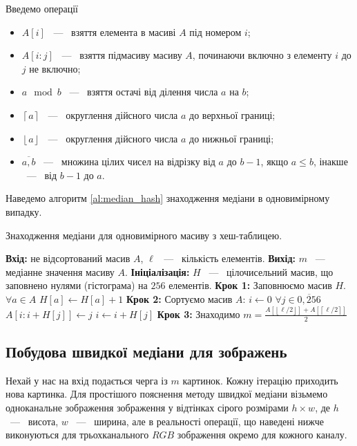 Введемо операції
\begin{itemize}
    \item $A[i]$ ~---~ взяття елемента в масиві $A$ під номером $i$;
    \item $A[i:j]$ ~---~ взяття підмасиву масиву $A$, починаючи включно з елементу $i$ до $j$ не включно;
    \item $a \mod b$ ~---~ взяття остачі від ділення числа $a$ на $b$;
    \item $\left\lceil a \right\rceil$ ~---~ округлення дійсного числа $a$ до верхньої границі;
    \item $\left\lfloor a \right\rfloor$ ~---~ округлення дійсного числа $a$ до нижньої границі;
    \item $\overline{a,b}$ ~---~ множина цілих чисел на відрізку від $a$ до $b-1$, якщо $a \le b$,
          інакше  ~---~ від $b-1$ до $a$.
\end{itemize}
Наведемо алгоритм \ref{al:median_hash} знаходження медіани в одновимірному випадку.

\begin{algorithm}[H]
    \caption{Знаходження медіани для одновимірного масиву з хеш-таблицею.}
    \label{al:median_hash}
    \begin{algorithmic}
        \State \textbf{Вхід:} не відсортований масив $A$, $\ell$ ~---~ кількість елементів.
        \State \textbf{Вихід:} $m$ ~---~ медіанне значення масиву $A$.
        \State \textbf{Ініціалізація:} $H$ ~---~ цілочисельний масив, що заповнено нулями (гістограма) на $256$ елементів.
        \State \textbf{Крок 1:} Заповнюємо масив $H$.
        \State $\forall a \in A$
        \State \qquad $ H[a] \gets H[a] + 1 $
        \State \textbf{Крок 2:} Сортуємо масив $ A $:
        \State $ i \gets 0 $
        \State $ \forall j \in \overline{0,256} $
        \State \qquad  $ A[i:i+H[j]] \gets j $
        \State \qquad  $ i \gets i + H[j] $
        \State \textbf{Крок 3:} Знаходимо $m = \frac{A[  \left\lfloor \ell/2 \right\rfloor   ] + A[\left\lceil \ell/2 \right\rceil ]}{2} $
    \end{algorithmic}
\end{algorithm}

\subsection{Побудова швидкої медіани для зображень}

Нехай у нас на вхід подається черга із $m$ картинок. Кожну ітерацію приходить нова картинка.
Для простішого пояснення методу швидкої медіани візьмемо одноканальне зображення
зображення у відтінках сірого розмірами $h \times w$, де $h$ ~---~ висота, $w$ ~---~ ширина,
але в реальності операції, що наведені нижче виконуються для трьохканального $RGB$ зображення
окремо для кожного каналу.


